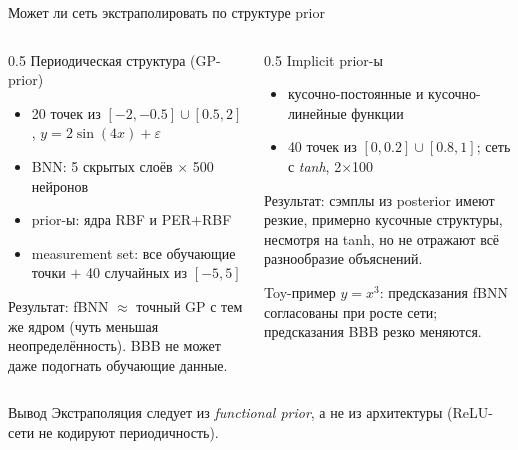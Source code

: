 \documentclass[aspectratio=169,9pt]{beamer}
\begin{document}
\begin{frame}{Может ли сеть экстраполировать по структуре prior}
  \begin{columns}[T]
    \begin{column}{0.5\textwidth}
      \textcolor{structure}{Периодическая структура (GP-prior)}
      \begin{itemize}
        \item 20 точек из $[-2,-0.5]\cup[0.5,2]$, $y=2\sin(4x)+\varepsilon$
        \item BNN: 5 скрытых слоёв $\times$ 500 нейронов
        \item prior-ы: ядра RBF и PER$+$RBF
        \item measurement set: все обучающие точки $+$ 40 случайных из $[-5,5]$
      \end{itemize}
      Результат: fBNN $\approx$ точный GP с тем же ядром (чуть меньшая неопределённость). BBB не может даже подогнать обучающие данные.
    \end{column}
    \begin{column}{0.5\textwidth}
      \textcolor{structure}{Implicit prior-ы}
      \begin{itemize}
        \item кусочно-постоянные и кусочно-линейные функции
        \item 40 точек из $[0,0.2]\cup[0.8,1]$; сеть с \emph{tanh}, 2$\times$100
      \end{itemize}
      Результат: сэмплы из posterior имеют резкие, примерно кусочные структуры, несмотря на tanh, но не отражают всё разнообразие объяснений.

      \medskip
      Toy-пример $y=x^3$: предсказания fBNN согласованы при росте сети; предсказания BBB резко меняются.
    \end{column}
  \end{columns}
  \vspace{0.5em}
  \begin{block}{Вывод}
    Экстраполяция следует из \emph{functional prior}, а не из архитектуры (ReLU-сети не кодируют периодичность).
  \end{block}
\end{frame}
\end{document}
